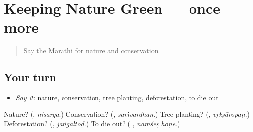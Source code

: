 \section[(dialogue)]{Keeping Nature Green — once more}

\label{lesson:MR-R449-review-final-449}



\begin{quote}
Say the Marathi for nature and conservation.
\end{quote}

\subsection*{Your turn}
\begin{itemize}
\raggedright
  \item \emph{Say it:} nature, conservation, tree planting, deforestation, to die out
\end{itemize}

\begin{tcolorbox}[breakable,colback=teal!4,colframe=teal!35!black,title={Before you move on}]
Nature? (\textbf{}, \emph{nisarga}.) Conservation? (\textbf{}, \emph{saṁvardhan}.) Tree planting? (\textbf{}, \emph{vṛkṣāropaṇ}.) Deforestation? (\textbf{}, \emph{jaṅgaltoḍ}.) To die out? (\textbf{ }, \emph{nāmśeṣ hoṇe}.)
\end{tcolorbox}
